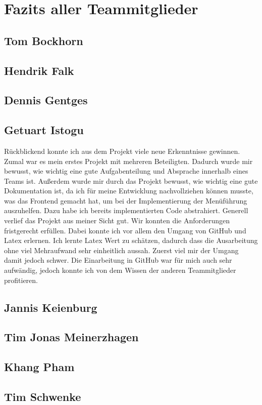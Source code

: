 \section{Fazits aller Teammitglieder}

\subsection{Tom Bockhorn}

\subsection{Hendrik Falk}

\subsection{Dennis Gentges}

\subsection{Getuart Istogu}

Rückblickend konnte ich aus dem Projekt viele neue Erkenntnisse gewinnen. Zumal war es mein erstes Projekt mit mehreren Beteiligten. Dadurch wurde mir bewusst, wie wichtig eine gute Aufgabenteilung und Absprache innerhalb eines Teams ist. Außerdem wurde mir durch das Projekt bewusst, wie wichtig eine gute Dokumentation ist, da ich für meine Entwicklung nachvollziehen können musste, was das Frontend gemacht hat, um bei der Implementierung der Menüführung auszuhelfen. Dazu habe ich bereits implementierten Code abstrahiert.
Generell verlief das Projekt aus meiner Sicht gut. Wir konnten die Anforderungen fristgerecht erfüllen. Dabei konnte ich vor allem den Umgang von GitHub und Latex erlernen. Ich lernte Latex Wert zu schätzen, dadurch dass die Ausarbeitung ohne viel Mehraufwand sehr einheitlich aussah. Zuerst viel mir der Umgang damit jedoch schwer. Die Einarbeitung in GitHub war für mich auch sehr aufwändig, jedoch konnte ich von dem Wissen der anderen Teammitglieder profitieren.

\subsection{Jannis Keienburg}

\subsection{Tim Jonas Meinerzhagen}

\subsection{Khang Pham}

\subsection{Tim Schwenke}
